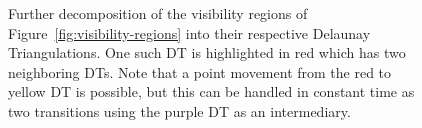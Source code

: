 \begin{figure}
  \begin{center}
    
  \end{center}
  \caption{\label{fig:delaunay-triangles}
    Further decomposition of the visibility regions of
    Figure~\ref{fig:visibility-regions} into their respective
    Delaunay Triangulations. One such DT is highlighted in red
    which has two neighboring DTs. Note that a point movement from
    the red to yellow DT is possible, but this can be handled in
    constant time as two transitions using the purple DT as an
    intermediary.
  }
\end{figure}

